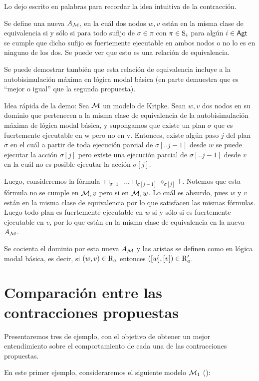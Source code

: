 Lo dejo escrito en palabras para recordar la idea intuitiva de la contracción.

Se define una nueva $A_\modults$, en la cuál dos nodos $w, v$ están en la misma clase de equivalencia si y sólo si para todo sufijo de 
$\sigma \in \pi$ con $\pi \in \S_i$ para algún $i \in \AGT$ se cumple que dicho sufijo es fuertemente ejecutable en ambos nodos o no lo 
es en ninguno de los dos. Se puede ver que esto es una relación de equivalencia.

Se puede demostrar también que esta relación de equivalencia incluye a la autobisimulación máxima en lógica modal básica (en parte demuestra 
que es ``mejor o igual'' que la segunda propuesta).

Idea rápida de la demo:
Sea $\modults$ un modelo de Kripke. Sean $w,v$ dos nodos en su dominio que pertenecen a la misma clase de equivalencia 
de la autobisimulación máxima de lógica modal básica, y supongamos que existe un plan $\sigma$ que es fuertemente ejecutable en w pero no en v. Entonces, existe algún paso $j$ del 
plan $\sigma$ en el cuál a partir de toda ejecución parcial de $\sigma[..j-1]$ desde $w$ se puede ejecutar la acción $\sigma[j]$ pero existe una 
ejecución parcial de $\sigma[..j-1]$ desde $v$ en la cuál no es posible ejecutar la acción $\sigma[j]$.

Luego, consideremos la fórmula $\Box_{\sigma[1]}...\Box_{\sigma[j-1]}\diamond_{\sigma[j]} \top$. Notemos que esta fórmula no se cumple en 
$\modults,v$ pero si en $\modults,w$. Lo cuál es absurdo, pues $w$ y $v$ están en la misma clase de equivalencia por lo que satisfacen las 
mismas fórmulas. Luego todo plan es fuertemente ejecutable en $w$ si y sólo si es fuertemente ejecutable en $v$, por lo que están en la 
misma clase de equivalencia en la nueva $A_\modults$.

Se cocienta el dominio por esta nueva $A_\modults$ y las aristas se definen como en lógica modal básica, es decir, si $(w,v) \in \R_a$ 
entonces $([w],[v]) \in \R'_a$.

\section{Comparación entre las contracciones propuestas}

Presentaremos tres \ultss de ejemplo, con el objetivo de obtener un mejor entendimiento sobre el comportamiento de cada una de las 
contracciones propuestas.

En este primer ejemplo, consideraremos el siguiente modelo $\modults_1$ ():

